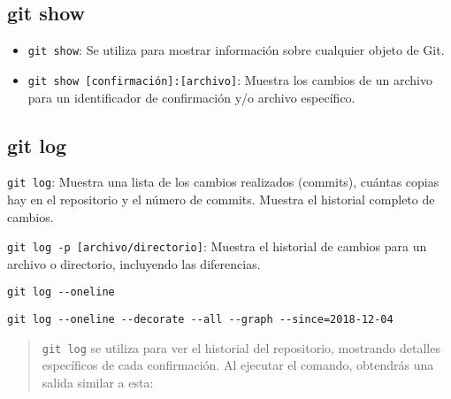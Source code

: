 \documentclass[
  a4paper,
]{article}
\newenvironment{Shaded}{}{}
\newcommand{\AttributeTok}[1]{\textcolor[rgb]{0.84,0.23,0.29}{#1}}
\newcommand{\ErrorTok}[1]{\textcolor[rgb]{1.00,0.33,0.33}{\underline{#1}}}
\newcommand{\ExtensionTok}[1]{\textcolor[rgb]{0.84,0.23,0.29}{\textbf{#1}}}
\newcommand{\KeywordTok}[1]{\textcolor[rgb]{0.84,0.23,0.29}{#1}}
\newcommand{\NormalTok}[1]{\textcolor[rgb]{0.14,0.16,0.18}{#1}}
\newcommand{\OperatorTok}[1]{\textcolor[rgb]{0.14,0.16,0.18}{#1}}
\begin{document}
\subsection{git show}\label{git-show}

\begin{itemize}
\item
  \texttt{git\ show}: Se utiliza para mostrar información sobre
  cualquier objeto de Git.
\item
  \texttt{git\ show\ {[}confirmación{]}:{[}archivo{]}}: Muestra los
  cambios de un archivo para un identificador de confirmación y/o
  archivo específico.
\end{itemize}

\subsection{git log}\label{git-log}

\texttt{git\ log}: Muestra una lista de los cambios realizados
(commits), cuántas copias hay en el repositorio y el número de commits.
Muestra el historial completo de cambios.

\texttt{git\ log\ -p\ {[}archivo/directorio{]}}: Muestra el historial de
cambios para un archivo o directorio, incluyendo las diferencias.

\texttt{git\ log\ -\/-oneline}

\texttt{git\ log\ -\/-oneline\ -\/-decorate\ -\/-all\ -\/-graph\ -\/-since=2018-12-04}

\begin{quote}
\texttt{git\ log} se utiliza para ver el historial del repositorio,
mostrando detalles específicos de cada confirmación. Al ejecutar el
comando, obtendrás una salida similar a esta:
\end{quote}

\begin{Shaded}
\end{Shaded}
\end{document}
